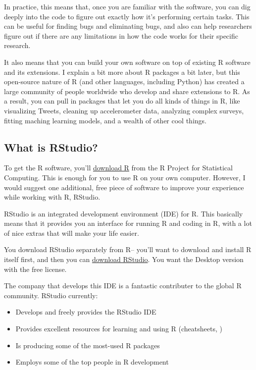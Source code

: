 \documentclass[]{book}
\providecommand{\tightlist}{%
  \setlength{\itemsep}{0pt}\setlength{\parskip}{0pt}}
\theoremstyle{definition}
\theoremstyle{definition}
\theoremstyle{definition}
\theoremstyle{remark}
\begin{document}
In practice, this means that, once you are familiar with the software,
you can dig deeply into the code to figure out exactly how it's
performing certain tasks. This can be useful for finding bugs and
eliminating bugs, and also can help researchers figure out if there are
any limitations in how the code works for their specific research.

It also means that you can build your own software on top of existing R
software and its extensions. I explain a bit more about R packages a bit
later, but this open-source nature of R (and other languages, including
Python) has created a large community of people worldwide who develop
and share extensions to R. As a result, you can pull in packages that
let you do all kinds of things in R, like visualizing Tweets, cleaning
up accelerometer data, analyzing complex surveys, fitting maching
learning models, and a wealth of other cool things.

\subsection{What is RStudio?}\label{what-is-rstudio}

To get the R software, you'll \href{https://www.r-project.org}{download
R} from the R Project for Statistical Computing. This is enough for you
to use R on your own computer. However, I would suggest one additional,
free piece of software to improve your experience while working with R,
RStudio.

RStudio is an integrated development environment (IDE) for R. This
basically means that it provides you an interface for running R and
coding in R, with a lot of nice extras that will make your life easier.

You download RStudio separately from R-- you'll want to download and
install R itself first, and then you can
\href{https://www.rstudio.com/products/rstudio/download2/}{download
RStudio}. You want the Desktop version with the free license.

The company that develops this IDE is a fantastic contributer to the
global R community. RStudio currently:

\begin{itemize}
\tightlist
\item
  Develops and freely provides the RStudio IDE
\item
  Provides excellent resources for learning and using R (cheatsheets, )
\item
  Is producing some of the most-used R packages
\item
  Employs some of the top people in R development
\end{itemize}
\end{document}

